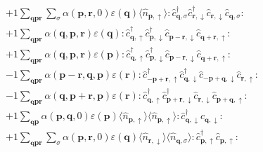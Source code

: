 \begin{align*}
	&+1 \sum_{ \mathbf{q} \mathbf{p} \mathbf{r} } \sum_{ \sigma } \alpha( \mathbf{p}, \mathbf{r}, 0 )  \varepsilon( \mathbf{q} )   \langle \hat{n}_{ \mathbf{p}, \uparrow } \rangle :\hat{c}_{ \mathbf{q}, \sigma }^\dagger \hat{c}_{ \mathbf{r}, \downarrow }^\dagger \hat{c}_{ \mathbf{r}, \downarrow }^{\phantom{\dagger}}\hat{c}_{ \mathbf{q}, \sigma }^{\phantom{\dagger}}: \\
	&+1 \sum_{ \mathbf{q} \mathbf{p} \mathbf{r} } \alpha( \mathbf{q}, \mathbf{p}, \mathbf{r} )  \varepsilon( \mathbf{q} )   :\hat{c}_{ \mathbf{q}, \uparrow }^\dagger \hat{c}_{ \mathbf{p}, \downarrow }^\dagger \hat{c}_{ \mathbf{p}-\mathbf{r}, \downarrow }^{\phantom{\dagger}}\hat{c}_{ \mathbf{q}+\mathbf{r}, \uparrow }^{\phantom{\dagger}}: \\
	&+1 \sum_{ \mathbf{q} \mathbf{p} \mathbf{r} } \alpha( \mathbf{q}, \mathbf{p}, \mathbf{r} )  \varepsilon( \mathbf{p} )   :\hat{c}_{ \mathbf{q}, \uparrow }^\dagger \hat{c}_{ \mathbf{p}, \downarrow }^\dagger \hat{c}_{ \mathbf{p}-\mathbf{r}, \downarrow }^{\phantom{\dagger}}\hat{c}_{ \mathbf{q}+\mathbf{r}, \uparrow }^{\phantom{\dagger}}: \\
	&-1 \sum_{ \mathbf{q} \mathbf{p} \mathbf{r} } \alpha( \mathbf{p}-\mathbf{r}, \mathbf{q}, \mathbf{p} )  \varepsilon( \mathbf{r} )   :\hat{c}_{ -\mathbf{p}+\mathbf{r}, \uparrow }^\dagger \hat{c}_{ \mathbf{q}, \downarrow }^\dagger \hat{c}_{ -\mathbf{p}+\mathbf{q}, \downarrow }^{\phantom{\dagger}}\hat{c}_{ \mathbf{r}, \uparrow }^{\phantom{\dagger}}: \\
	&-1 \sum_{ \mathbf{q} \mathbf{p} \mathbf{r} } \alpha( \mathbf{q}, \mathbf{p}+\mathbf{r}, \mathbf{p} )  \varepsilon( \mathbf{r} )   :\hat{c}_{ \mathbf{q}, \uparrow }^\dagger \hat{c}_{ \mathbf{p}+\mathbf{r}, \downarrow }^\dagger \hat{c}_{ \mathbf{r}, \downarrow }^{\phantom{\dagger}}\hat{c}_{ \mathbf{p}+\mathbf{q}, \uparrow }^{\phantom{\dagger}}: \\
	&+1 \sum_{ \mathbf{q} \mathbf{p} } \alpha( \mathbf{p}, \mathbf{q}, 0 )  \varepsilon( \mathbf{p} )   \langle \hat{n}_{ \mathbf{p}, \uparrow } \rangle \langle \hat{n}_{ \mathbf{p}, \uparrow } \rangle :\hat{c}_{ \mathbf{q}, \downarrow }^\dagger \hat{c}_{ \mathbf{q}, \downarrow }^{\phantom{\dagger}}: \\
	&+1 \sum_{ \mathbf{q} \mathbf{p} \mathbf{r} } \sum_{ \sigma } \alpha( \mathbf{p}, \mathbf{r}, 0 )  \varepsilon( \mathbf{q} )   \langle \hat{n}_{ \mathbf{r}, \downarrow } \rangle \langle \hat{n}_{ \mathbf{q}, \sigma } \rangle :\hat{c}_{ \mathbf{p}, \uparrow }^\dagger \hat{c}_{ \mathbf{p}, \uparrow }^{\phantom{\dagger}}: \\

\end{align*}
